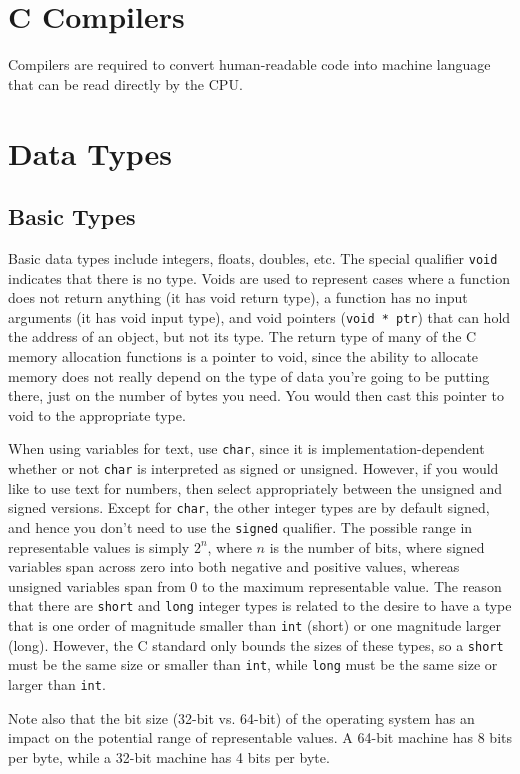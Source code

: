 \documentclass[10pt]{article}
\begin{document}
\section{C Compilers}
Compilers are required to convert human-readable code into machine language that can be read directly by the CPU. 

\section{Data Types}

\subsection{Basic Types}
Basic data types include integers, floats, doubles, etc. The special qualifier {\tt void} indicates that there is no type. Voids are used to represent cases where a function does not return anything (it has void return type), a function has no input arguments (it has void input type), and void pointers ({\tt void * ptr}) that can hold the address of an object, but not its type. The return type of many of the C memory allocation functions is a pointer to void, since the ability to allocate memory does not really depend on the type of data you're going to be putting there, just on the number of bytes you need. You would then cast this pointer to void to the appropriate type. 

When using variables for text, use {\tt char}, since it is implementation-dependent whether or not {\tt char} is interpreted as signed or unsigned. However, if you would like to use text for numbers, then select appropriately between the unsigned and signed versions. Except for {\tt char}, the other integer types are by default signed, and hence you don't need to use the {\tt signed} qualifier. The possible range in representable values is simply \(2^n\), where \(n\) is the number of bits, where signed variables span across zero into both negative and positive values, whereas unsigned variables span from 0 to the maximum representable value. The reason that there are {\tt short} and {\tt long} integer types is related to the desire to have a type that is one order of magnitude smaller than {\tt int} (short) or one magnitude larger (long). However, the C standard only bounds the sizes of these types, so a {\tt short} must be the same size or smaller than {\tt int}, while {\tt long} must be the same size or larger than {\tt int}. 

Note also that the bit size (32-bit vs. 64-bit) of the operating system has an impact on the potential range of representable values. A 64-bit machine has 8 bits per byte, while a 32-bit machine has 4 bits per byte. 
\end{document}

